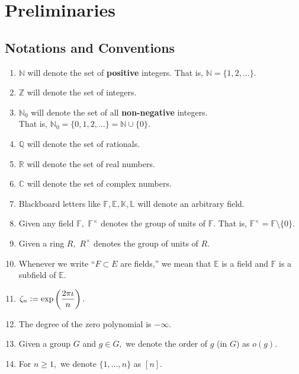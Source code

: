 \chapter{Preliminaries} \label{chap:00}

\section{Notations and Conventions}
\begin{enumerate}
    \item $\mathbb{N}$ will denote the set of \textbf{positive} integers. That is, $\mathbb{N} = \{1, 2, \ldots\}.$
    \item $\mathbb{Z}$ will denote the set of integers.
    \item $\mathbb{N}_0$ will denote the set of all \textbf{non-negative} integers. \\
    That is, $\mathbb{N}_0 = \{0, 1, 2, \ldots\} = \mathbb{N} \cup \{0\}.$
    \item $\mathbb{Q}$ will denote the set of rationals.
    \item $\mathbb{R}$ will denote the set of real numbers.
    \item $\mathbb{C}$ will denote the set of complex numbers.
    \item Blackboard letters like $\mathbb{F}, \mathbb{E}, \mathbb{K}, \mathbb{L}$ will denote an arbitrary field.
    \item Given any field $\mathbb{F},$ $\mathbb{F}^\times$ denotes the group of units of $\mathbb{F}.$ That is, $\mathbb{F}^\times = \mathbb{F}\setminus\{0\}.$
    \item Given a ring $R,$ $R^\times$ denotes the group of units of $R.$ 
    \item Whenever we write ``$F \subset E$ are fields,'' we mean that $\mathbb{E}$ is a field and $\mathbb{F}$ is a subfield of $\mathbb{E}.$
    \item $\zeta_n \vcentcolon= \exp\left(\dfrac{2\pi\iota}{n}\right).$
    \item The degree of the zero polynomial is $-\infty.$
    \item Given a group $G$ and $g \in G,$ we denote the order of $g$ (in $G$) as $o(g).$
    \item For $n \ge 1,$ we denote $\{1, \ldots, n\}$ as $[n].$
\end{enumerate}

